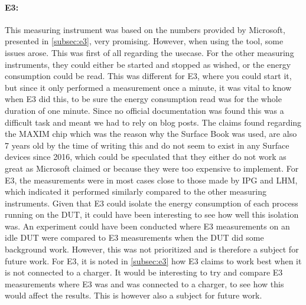 \paragraph*{E3:} This measuring instrument was based on the numbers provided by Microsoft, presented in \cref{subsec:e3}, very promising. However, when using the tool, some issues arose. This was first of all regarding the usecase. For the other measuring instruments, they could either be started and stopped as wished, or the energy consumption could be read. This was different for E3, where you could start it, but since it only performed a measurement once a minute, it was vital to know when E3 did this, to be sure the energy consumption read was for the whole duration of one minute. Since no official documentation was found this was a difficult task and meant we had to rely on blog posts. The claims found regarding the MAXIM chip which was the reason why the Surface Book was used, are also 7 years old by the time of writing this and do not seem to exist in any Surface devices since 2016, which could be speculated that they either do not work as great as Microsoft claimed or because they were too expensive to implement. For E3, the measurements were in most cases close to those made by IPG and LHM, which indicated it performed similarly compared to the other measuring instruments. Given that E3 could isolate the energy consumption of each process running on the DUT, it could have been interesting to see how well this isolation was. An experiment could have been conducted where E3 measurements on an idle DUT were compared to E3 measurements when the DUT did some background work. However, this was not prioritized and is therefore a subject for future work. For E3, it is noted in \cref{subsec:e3} how E3 claims to work best when it is not connected to a charger. It would be interesting to try and compare E3 measurements where E3 was and was connected to a charger, to see how this would affect the results. This is however also a subject for future work.


